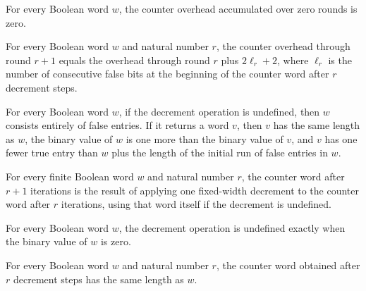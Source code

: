 \begin{theorem}
\label{Turing.counterOverhead_zero}
\leanok
{}
For every Boolean word $w$, the counter overhead accumulated over zero rounds is zero.
\end{theorem}

\begin{theorem}
\label{Turing.counterOverhead_succ}
\leanok
{}
For every Boolean word $w$ and natural number $r$, the counter overhead through round
$r+1$ equals the overhead through round $r$ plus $2\ell_r+2$, where $\ell_r$ is the
number of consecutive false bits at the beginning of the counter word after $r$
decrement steps.
\end{theorem}

\begin{lemma}
\label{Turing.counter_dec_spec}
\leanok
{}
For every Boolean word $w$, if the decrement operation is undefined, then $w$ consists
entirely of false entries. If it returns a word $v$, then $v$ has the same length as
$w$, the binary value of $w$ is one more than the binary value of $v$, and $v$ has one
fewer true entry than $w$ plus the length of the initial run of false entries in $w$.
\end{lemma}

\begin{lemma}
\label{Turing.counter_word_succ}
\leanok
{}
For every finite Boolean word $w$ and natural number $r$, the counter word after $r+1$
iterations is the result of applying one fixed-width decrement to the counter word after
$r$ iterations, using that word itself if the decrement is undefined.
\end{lemma}

\begin{lemma}
\label{Turing.counter_dec_zero}
\leanok
{}
For every Boolean word $w$, the decrement operation is undefined exactly when the binary
value of $w$ is zero.
\end{lemma}

\begin{theorem}
\label{Turing.counterWord_length}
\leanok
{}
For every Boolean word $w$ and natural number $r$, the counter word obtained after $r$
decrement steps has the same length as $w$.
\end{theorem}

